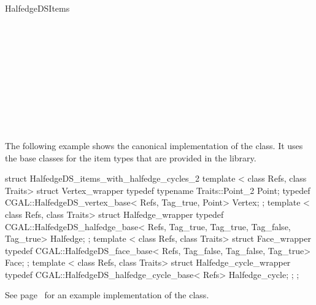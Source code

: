 \begin{ccRefConcept}{HalfedgeDSItems}
\ccSeeAlso

\\
\\
\\
\\
\\
\\
\\
\\
\\

\ccExample

The following example shows the canonical implementation of the
 class. It uses the base classes for the
item types that are provided in the library.

\begin{ccExampleCode}
struct HalfedgeDS_items_with_halfedge_cycles_2 {
    template < class Refs, class Traits>
    struct Vertex_wrapper {
        typedef typename Traits::Point_2 Point;
        typedef CGAL::HalfedgeDS_vertex_base< Refs, Tag_true, Point> Vertex;
    };
    template < class Refs, class Traits>
    struct Halfedge_wrapper {
        typedef CGAL::HalfedgeDS_halfedge_base< Refs, Tag_true, Tag_true, Tag_false, Tag_true> Halfedge;
    };
    template < class Refs, class Traits>
    struct Face_wrapper {
        typedef CGAL::HalfedgeDS_face_base< Refs, Tag_false, Tag_false, Tag_true> Face;
    };
    template < class Refs, class Traits>
    struct Halfedge_cycle_wrapper {
        typedef CGAL::HalfedgeDS_halfedge_cycle_base< Refs> Halfedge_cycle;
    };
};
\end{ccExampleCode}

See page~\pageref{pageHalfedgeDSitemsRef} for an example implementation 
of the  class.

\end{ccRefConcept}

\ccRefPageEnd

